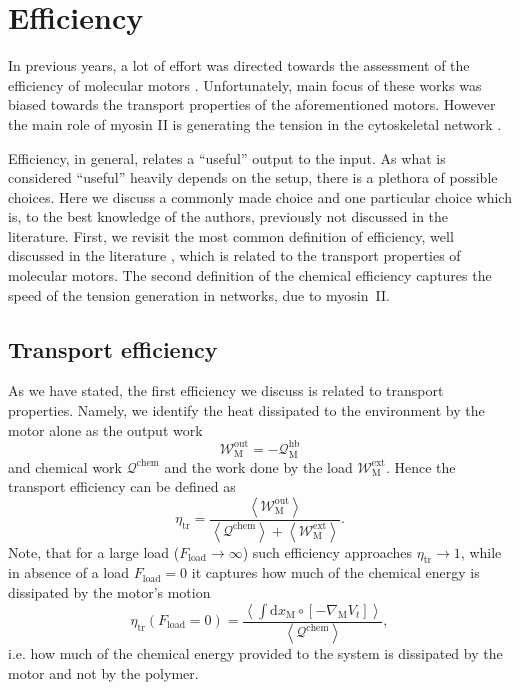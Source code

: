 \documentclass[aps,pre,twocolumn,showpacs,showkeys,superscriptaddress,floatfix]{revtex4-1}
\newcommand{\rmd}{{\mathrm d}}
\begin{document}
\section{Efficiency} 
\label{sec:efficiency}
In previous years, a lot of effort was directed towards the assessment of the efficiency of molecular motors \cite{Schmiedl2008,boksenbojm2009entropy,parmeggiani1999energy,parrondo1998efficiency,zhang2009efficiency}. 
Unfortunately, main focus of these works was biased towards the transport properties of the aforementioned motors. 
However the main role of myosin II is generating the tension in the cytoskeletal network \cite{ma2012nonmuscle,chugh2017actin,monier2010actomyosin}.

Efficiency, in general, relates a ``useful'' output to the input.
As what is considered ``useful'' heavily depends on the setup, there is a plethora of possible choices.
Here we discuss a commonly made choice and one particular choice which is, to the best knowledge of the authors, previously not discussed in the literature. 
First, we revisit the most common definition of efficiency, well discussed in the literature \cite{Schmiedl2008,boksenbojm2009entropy,parmeggiani1999energy,zhang2009efficiency}, which is related to the transport properties of molecular motors. 
The second definition of the chemical efficiency captures the speed of the tension generation in networks, due to myosin~II. %

\subsection{Transport efficiency} 
As we have stated, the first efficiency we discuss is related to transport properties. 
Namely, we identify the heat dissipated to the environment by the motor alone as the output work 
\[
{\mathcal W}^\text{out}_\text{M} = - {\mathcal Q}^\text{hb}_\text{M} 
\] 
and chemical work $\mathcal Q^\text{chem}$ and the work done by the load $\mathcal W^\text{ext}_\text{M}$.
Hence the transport efficiency can be defined as 
\[
\eta_\text{tr} = \frac{ \left\langle {\mathcal W}^\text{out}_\text{M} \right\rangle }{ \left\langle {\mathcal Q}^\text{chem} \right\rangle + \left\langle {\mathcal W}^\text{ext}_\text{M} \right\rangle } .
\]
Note, that for a large load ($F_\text{load} \to \infty$) such efficiency approaches $\eta_\text{tr} \to 1$, 
while in absence of a load $F_\text{load} = 0$ it captures how much of the chemical energy is dissipated by the motor's motion  
\[
\eta_\text{tr}( F_\text{load} = 0 ) = \frac{ \left\langle \int \rmd x_\text{M} \circ \left[ - \nabla_\text{M} V_t \right] \right\rangle }{ \left\langle {\mathcal Q}^\text{chem} \right\rangle } ,
\]
i.e. how much of the chemical energy provided to the system is dissipated by the motor and not by the polymer. 
\end{document}
